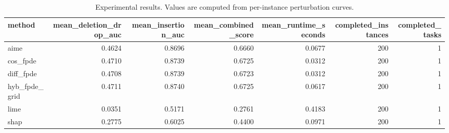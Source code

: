 \begin{table}[t]
\caption{Experimental results. Values are computed from per-instance perturbation curves.}
\label{tab:main_results_computed}
\centering
\begin{tabular}{lrrrrrr}
\toprule
method & mean\_deletion\_drop\_auc & mean\_insertion\_auc & mean\_combined\_score & mean\_runtime\_seconds & completed\_instances & completed\_tasks \\
\midrule
aime & 0.4624 & 0.8696 & 0.6660 & 0.0677 & 200 & 1 \\
cos\_fpde & 0.4710 & 0.8739 & 0.6725 & 0.0312 & 200 & 1 \\
diff\_fpde & 0.4708 & 0.8739 & 0.6723 & 0.0312 & 200 & 1 \\
hyb\_fpde\_grid & 0.4711 & 0.8740 & 0.6725 & 0.0617 & 200 & 1 \\
lime & 0.0351 & 0.5171 & 0.2761 & 0.4183 & 200 & 1 \\
shap & 0.2775 & 0.6025 & 0.4400 & 0.0971 & 200 & 1 \\
\bottomrule
\end{tabular}

\end{table}
